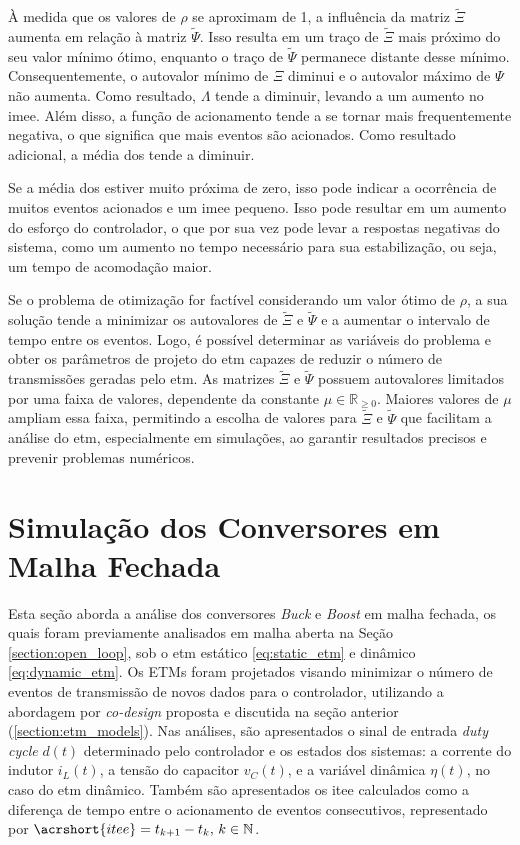 À medida que os valores de $\rho$ se aproximam de 1, a influência da matriz $\tilde{\Xi}$ aumenta em relação à matriz $\tilde{\Psi}$. Isso resulta em um traço de $\tilde{\Xi}$ mais próximo do seu valor mínimo ótimo, enquanto o traço de $\tilde{\Psi}$ permanece distante desse mínimo. Consequentemente, o autovalor mínimo de $\Xi$ diminui e o autovalor máximo de $\Psi$ não aumenta. Como resultado, $\Lambda$ tende a diminuir, levando a um aumento no \acrshort{imee}. Além disso, a função de acionamento tende a se tornar mais frequentemente negativa, o que significa que mais eventos são acionados. Como resultado adicional, a média dos  tende a diminuir.

Se a média dos  estiver muito próxima de zero, isso pode indicar a ocorrência de muitos eventos acionados e um \acrshort{imee} pequeno. Isso pode resultar em um aumento do esforço do controlador, o que por sua vez pode levar a respostas negativas do sistema, como um aumento no tempo necessário para sua estabilização, ou seja, um tempo de acomodação maior.

Se o problema de otimização for factível considerando um valor ótimo de $\rho$, a sua solução tende a minimizar os autovalores de $\tilde{\Xi}$ e $\tilde{\Psi}$ e a aumentar o intervalo de tempo entre os eventos. Logo, é possível determinar as variáveis do problema e obter os parâmetros de projeto do \acrshort{etm} capazes de reduzir o número de transmissões geradas pelo \acrshort{etm}.
As matrizes $\tilde{\Xi}$ e $\tilde{\Psi}$ possuem autovalores limitados por uma faixa de valores, dependente da constante $\mu \in \mathbb{R}_{\geq 0}$. Maiores valores de $\mu$ ampliam essa faixa, permitindo a escolha de valores para $\tilde{\Xi}$ e $\tilde{\Psi}$ que facilitam a análise do \acrshort{etm}, especialmente em simulações, ao garantir resultados precisos e prevenir problemas numéricos. 

\section{Simulação dos Conversores em Malha Fechada}

Esta seção aborda a análise dos conversores \textit{Buck} e \textit{Boost }em malha fechada, os quais foram previamente analisados em malha aberta na Seção \ref{section:open_loop}, sob o \acrshort{etm} estático \eqref{eq:static_etm} e dinâmico \eqref{eq:dynamic_etm}. Os ETMs foram projetados visando minimizar o número de eventos de transmissão de novos dados para o controlador, utilizando a abordagem por \textit{co-design} proposta e discutida na seção anterior (\autoref{section:etm_models}). Nas análises, são apresentados o sinal de entrada \textit{duty cycle} $d(t)$ determinado pelo controlador e os estados dos sistemas: a corrente do indutor $i_L(t)$, a tensão do capacitor $v_C(t)$, e a variável dinâmica $\eta(t)$, no caso do \acrshort{etm} dinâmico. Também são apresentados os \acrfull{itee} calculados como a diferença de tempo entre o acionamento de eventos consecutivos, representado por $\acrshort{itee} = t_{k + 1} - t_k, \, k \in \mathbb{N}$.

